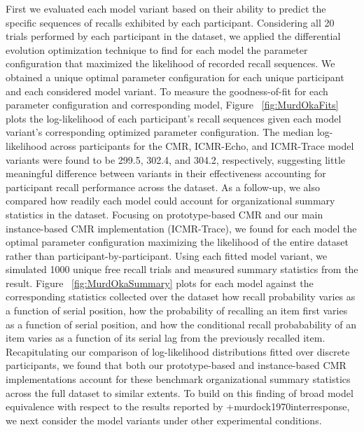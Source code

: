 {}First we evaluated each model variant based on their ability to predict the specific sequences of recalls exhibited by each participant. Considering all 20 trials performed by each participant in the dataset, we applied the differential evolution optimization technique to find for each model the parameter configuration that maximized the likelihood of recorded recall sequences. We obtained a unique optimal parameter configuration for each unique participant and each considered model variant. To measure the goodness-of-fit for each parameter configuration and corresponding model, Figure ~\ref{fig:MurdOkaFits} plots the log-likelihood of each participant's recall sequences given each model variant's corresponding optimized parameter configuration. The median log-likelihood across participants for the CMR, ICMR-Echo, and ICMR-Trace model variants were found to be 299.5, 302.4, and 304.2, respectively, suggesting little meaningful difference between variants in their effectiveness accounting for participant recall performance across the dataset.\markdownRendererInterblockSeparator
{}As a follow-up, we also compared how readily each model could account for organizational summary statistics in the dataset. Focusing on prototype-based CMR and our main instance-based CMR implementation (ICMR-Trace), we found for each model the optimal parameter configuration maximizing the likelihood of the entire dataset rather than participant-by-participant. Using each fitted model variant, we simulated 1000 unique free recall trials and measured summary statistics from the result. Figure ~\ref{fig:MurdOkaSummary} plots for each model against the corresponding statistics collected over the dataset how recall probability varies as a function of serial position, how the probability of recalling an item first varies as a function of serial position, and how the conditional recall probabability of an item varies as a function of its serial lag from the previously recalled item. Recapitulating our comparison of log-likelihood distributions fitted over discrete participants, we found that both our prototype-based and instance-based CMR implementations account for these benchmark organizational summary statistics across the full dataset to similar extents. To build on this finding of broad model equivalence with respect to the results reported by +{}{}{murdock1970interresponse}, we next consider the model variants under other experimental conditions.\relax